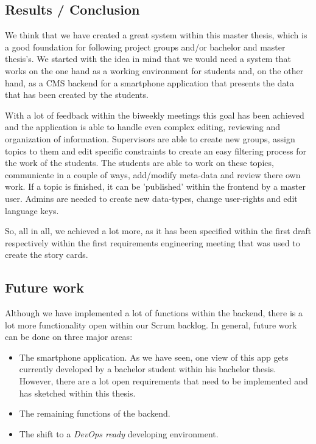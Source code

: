 \subsection{Results / Conclusion}
We think that we have created a great system within this master thesis, which is a good foundation for following project groups and/or bachelor and master thesis's. We started with the idea in mind that we would need a system that works on the one hand as a working environment for students and, on the other hand, as a \ac{CMS} backend for a smartphone application that presents the data that has been created by the students. 

With a lot of feedback within the biweekly meetings this goal has been achieved and the application is able to handle even complex editing, reviewing and organization of information. Supervisors are able to create new groups, assign topics to them and edit specific constraints to create an easy filtering process for the work of the students. The students are able to work on these topics, communicate in a couple of ways, add/modify meta-data and review there own work. If a topic is finished, it can be 'published' within the frontend by a master user. Admins are needed to create new data-types, change user-rights and edit language keys.

So, all in all, we achieved a lot more, as it has been specified within the first draft respectively within the first requirements engineering meeting that was used to create the story cards.

\subsection{Future work}
\label{futurework}
Although we have implemented a lot of functions within the backend, there is a lot more functionality open within our Scrum backlog. In general, future work can be done on three major areas:

\begin{itemize}
\item The smartphone application. As we have seen, one view of this app gets currently developed by a bachelor student within his bachelor thesis. However, there are a lot open requirements that need to be implemented and has sketched within this thesis.
\item The remaining functions of the backend.
\item The shift to a \emph{DevOps ready} developing environment. 
\end{itemize}

